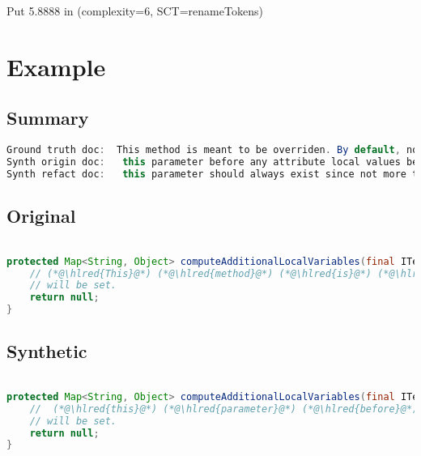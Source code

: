 \documentclass[11pt]{article}
\DeclareRobustCommand{\hlred}[1]{{\sethlcolor{YellowOrange}\hl{#1}}}
\begin{document}
Put 5.8888 in (complexity=6, SCT=renameTokens)

\pagebreak
\section{Example}
\subsection{Summary}

\begin{lstlisting}[language=java]
Ground truth doc:  This method is meant to be overriden. By default, no local variables
Synth origin doc:   this parameter before any attribute local values before tag parsing is executed is not
Synth refact doc:   this parameter should always exist since not more than this variable is expected to
\end{lstlisting}

\subsection{Original}
\begin{lstlisting}[language=java]

protected Map<String, Object> computeAdditionalLocalVariables(final ITemplateContext context, final IProcessableElementTag tag, final AttributeName attributeName, final String attributeValue, final IStandardExpression expression) {
    // (*@\hlred{This}@*) (*@\hlred{method}@*) (*@\hlred{is}@*) (*@\hlred{meant}@*) (*@\hlred{to}@*) (*@\hlred{be}@*) (*@\hlred{overriden.}@*) (*@\hlred{By}@*) (*@\hlred{default,}@*) (*@\hlred{no}@*) (*@\hlred{local}@*) (*@\hlred{variables}@*)
    // will be set.
    return null;
}
\end{lstlisting}
\subsection{Synthetic}

\begin{lstlisting}[language=java]

protected Map<String, Object> computeAdditionalLocalVariables(final ITemplateContext context, final IProcessableElementTag tag, final AttributeName attributeName, final String attributeValue, final IStandardExpression expression) {
    //  (*@\hlred{this}@*) (*@\hlred{parameter}@*) (*@\hlred{before}@*) (*@\hlred{any}@*) (*@\hlred{attribute}@*) (*@\hlred{local}@*) (*@\hlred{values}@*) (*@\hlred{before}@*) (*@\hlred{tag}@*) (*@\hlred{parsing}@*) (*@\hlred{is}@*) (*@\hlred{executed is not}@*)
    // will be set.
    return null;
}
\end{lstlisting}
\end{document}
